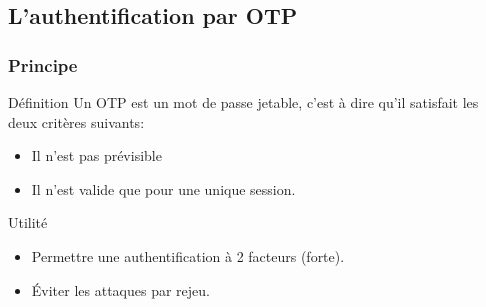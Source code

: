 \documentclass[xcolor=table]{beamer}
\begin{document}
\subsection{L'authentification par OTP}

\begin{frame}
\frametitle{Principe}
\begin{block}{Définition}
    Un OTP est un mot de passe jetable, c'est à dire qu'il satisfait les deux 
  critères suivants:
  \begin{itemize}
    \item Il n'est pas prévisible
    \item Il n'est valide que pour une unique session.
  \end{itemize}
\end{block}

\begin{block}{Utilité}
  \begin{itemize}
    \item Permettre une authentification à 2 facteurs (forte).
    \item Éviter les attaques par rejeu.
  \end{itemize}
\end{block}
\end{frame}
\end{document}
